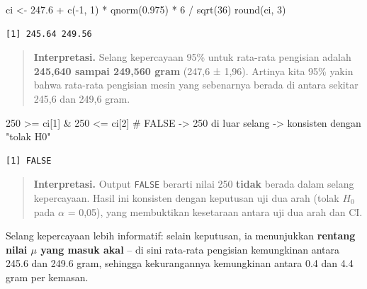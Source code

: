 \documentclass[
  indonesian,
  letterpaper,
]{book}
\newenvironment{Shaded}{\begin{snugshade}}{\end{snugshade}}
\newcommand{\CommentTok}[1]{\textcolor[rgb]{0.37,0.37,0.37}{#1}}
\newcommand{\DecValTok}[1]{\textcolor[rgb]{0.68,0.00,0.00}{#1}}
\newcommand{\FloatTok}[1]{\textcolor[rgb]{0.68,0.00,0.00}{#1}}
\newcommand{\FunctionTok}[1]{\textcolor[rgb]{0.28,0.35,0.67}{#1}}
\newcommand{\NormalTok}[1]{\textcolor[rgb]{0.00,0.23,0.31}{#1}}
\newcommand{\OtherTok}[1]{\textcolor[rgb]{0.00,0.23,0.31}{#1}}
\newcommand{\SpecialCharTok}[1]{\textcolor[rgb]{0.37,0.37,0.37}{#1}}
\begin{document}
\begin{Shaded}
\begin{Highlighting}[]
\NormalTok{ci }\OtherTok{\textless{}{-}} \FloatTok{247.6} \SpecialCharTok{+} \FunctionTok{c}\NormalTok{(}\SpecialCharTok{{-}}\DecValTok{1}\NormalTok{, }\DecValTok{1}\NormalTok{) }\SpecialCharTok{*} \FunctionTok{qnorm}\NormalTok{(}\FloatTok{0.975}\NormalTok{) }\SpecialCharTok{*} \DecValTok{6} \SpecialCharTok{/} \FunctionTok{sqrt}\NormalTok{(}\DecValTok{36}\NormalTok{)}
\FunctionTok{round}\NormalTok{(ci, }\DecValTok{3}\NormalTok{)}
\end{Highlighting}
\end{Shaded}

\begin{verbatim}
[1] 245.64 249.56
\end{verbatim}

\begin{quote}
\textbf{Interpretasi.} Selang kepercayaan 95\% untuk rata-rata pengisian
adalah \textbf{245,640 sampai 249,560 gram} (247,6 ± 1,96). Artinya kita
95\% yakin bahwa rata-rata pengisian mesin yang sebenarnya berada di
antara sekitar 245,6 dan 249,6 gram.
\end{quote}

\begin{Shaded}
\begin{Highlighting}[]
\DecValTok{250} \SpecialCharTok{\textgreater{}=}\NormalTok{ ci[}\DecValTok{1}\NormalTok{] }\SpecialCharTok{\&} \DecValTok{250} \SpecialCharTok{\textless{}=}\NormalTok{ ci[}\DecValTok{2}\NormalTok{]    }\CommentTok{\# FALSE {-}\textgreater{} 250 di luar selang {-}\textgreater{} konsisten dengan "tolak H0"}
\end{Highlighting}
\end{Shaded}

\begin{verbatim}
[1] FALSE
\end{verbatim}

\begin{quote}
\textbf{Interpretasi.} Output \texttt{FALSE} berarti nilai 250
\textbf{tidak} berada dalam selang kepercayaan. Hasil ini konsisten
dengan keputusan uji dua arah (tolak \(H_0\) pada \(\alpha\) = 0,05),
yang membuktikan kesetaraan antara uji dua arah dan CI.
\end{quote}

Selang kepercayaan lebih informatif: selain keputusan, ia menunjukkan
\textbf{rentang nilai \(\mu\) yang masuk akal} -- di sini rata-rata
pengisian kemungkinan antara 245.6 dan 249.6 gram, sehingga
kekurangannya kemungkinan antara 0.4 dan 4.4 gram per kemasan.
\end{document}
